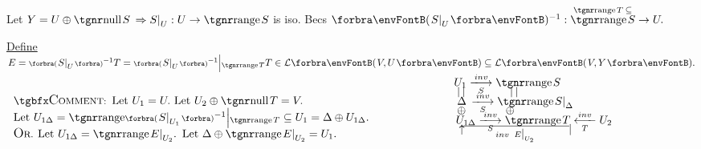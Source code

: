 Let $Y=U\oplus\null S$\vspace{-4pt}\parSol{}
$\Rightarrow S\mmid_U:U\rightarrow\range S$ is iso. Becs $\Par{S\mmid_U}{^{-1}}:\overset{\range T\:\subseteq}{{\range S}}\rightarrow U.$\par\quad
\uline{Define $E=\BigPar{S\mmid_U}{^{-1}}T=\BigPar{S\mmid_U}{^{-1}}\Big|{_{\range T}}T\in\Lm{V,U}\subseteq\Lm{V,Y}.$}\PfEnd\vspace{-20pt}\quad
\!\!\!$\hText{\\[6pt]$
	\AComm Let $U_1=U.$ Let $U_2\oplus\null T=V.\\$
	Let $U_{1\Delta}=\Range\BigPar{S\mmid_{U_1}}{^{-1}}\Big|{_{\range T}}\subseteq U_1=\Delta\oplus U_{1\Delta}.\\$
	\Or Let $U_{1\Delta}=\range E\mmid_{U_2}.$ \,Let $\Delta\oplus\range E\mmid_{U_2}=U_1.$
$}\qquad\qquad\qquad\quad$\FontSmall$\hText{U_1\xlongrightarrow[S]{inv}\range S\\[-8pt]\;\text{\small|\:|}\qquad\qquad\text{\small|\:|}\\[-6pt]\;\Delta\,\xlongrightarrow[S]{inv}\range S\mmid_{\Delta}\\[-8pt]\;\oplus\qquad\quad\;\;\oplus\\[-6pt]\,U_{1\Delta}\xlongrightarrow[S]{inv}\range T\xlongleftarrow[T]{inv}U_2\\[-8pt]\,\;\uparrow\qquad\qquad\qquad\qquad\quad|\\[-19pt]\,\;\,\underset{inv\;\;E\def\envFontA{\normalsize}\mmid_{U_2}}{{\uline{\qquad\qquad\qquad\qquad\qquad\!\!}}}}$\FontNorm\par\vspace{2pt}\quad
